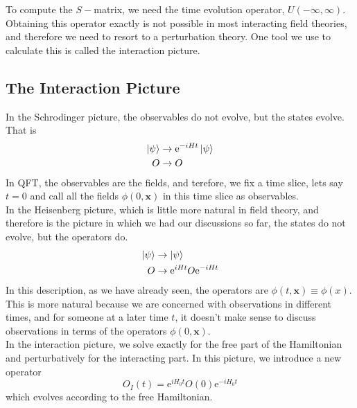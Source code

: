 \documentclass[11pt]{article}
\newcommand{\e}{\mathrm{e}}
\numberwithin{equation}{section}
\begin{document}
    To compute the \(S-\)matrix, we need the time evolution operator, \(U(-\infty, \infty)\). Obtaining this operator exactly is not possible in most interacting field theories, and therefore we need to resort to a perturbation theory. One tool we use to calculate this is called the interaction picture. 

    \subsection{The Interaction Picture}
    In the Schrodinger picture, the observables do not evolve, but the states evolve. That is 
    \begin{align*}
        \ket{\psi} &\to \e^{-iHt}\ket{\psi}\\
        O &\to O 
    \end{align*}
    In QFT, the observables are the fields, and terefore, we fix a time slice, lets say \(t=0\) and call all the fields \(\phi(0, \textbf{x})\) in this time slice as observables. \\

    In the Heisenberg picture, which is little more natural in field theory, and therefore is the picture in which we had our discussions so far, the states do not evolve, but the operators do. 
    \begin{align*}
        \ket{\psi} &\to \ket{\psi}\\
        O &\to \e^{iHt}O\e^{-iHt}
    \end{align*}
    In this description, as we have already seen, the operators are \(\phi(t, \textbf{x}) \equiv \phi(x)\). This is more natural because we are concerned with observations in different times, and for someone at a later time \(t\), it doesn't make sense to discuss observations in terms of the operators \(\phi(0, \textbf{x})\). \\

    In the interaction picture, we solve exactly for the free part of the Hamiltonian and perturbatively for the interacting part. In this picture, we introduce a new operator 
    \begin{equation*}
        O_I (t) = \e^{iH_0 t}O(0) \e^{-iH_0 t}
    \end{equation*}
    which evolves according to the free Hamiltonian.\\
\end{document}
